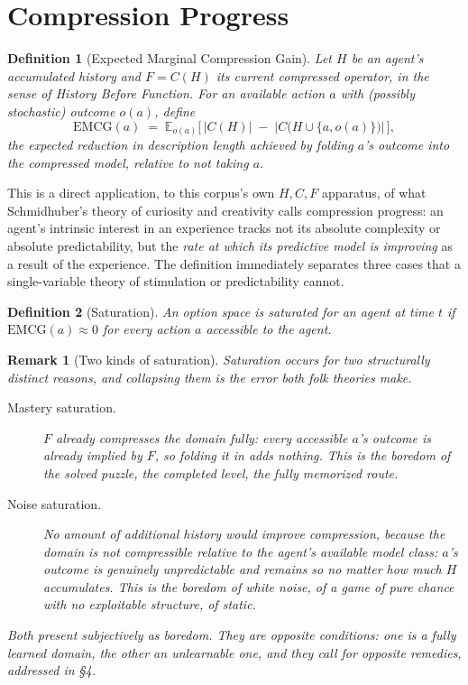 \documentclass[11pt]{article}
\newtheorem{definition}{Definition}[section]
\newtheorem*{remark}{Remark}
\begin{document}
\section{Compression Progress}

\begin{definition}[Expected Marginal Compression Gain]
Let $H$ be an agent's accumulated history and $F=C(H)$ its current compressed operator, in the sense of \emph{History Before Function}. For an available action $a$ with (possibly stochastic) outcome $o(a)$, define
\[
\mathrm{EMCG}(a) \;=\; \mathbb{E}_{o(a)}\Big[\,|C(H)| \;-\; |C\big(H\cup\{a,o(a)\}\big)|\,\Big],
\]
the expected reduction in description length achieved by folding $a$'s outcome into the compressed model, relative to not taking $a$.
\end{definition}

This is a direct application, to this corpus's own $H,C,F$ apparatus, of what Schmidhuber's theory of curiosity and creativity calls compression progress: an agent's intrinsic interest in an experience tracks not its absolute complexity or absolute predictability, but the \emph{rate at which its predictive model is improving} as a result of the experience. The definition immediately separates three cases that a single-variable theory of stimulation or predictability cannot.

\begin{definition}[Saturation]
An option space is \emph{saturated} for an agent at time $t$ if $\mathrm{EMCG}(a) \approx 0$ for every action $a$ accessible to the agent.
\end{definition}

\begin{remark}[Two kinds of saturation]
Saturation occurs for two structurally distinct reasons, and collapsing them is the error both folk theories make.
\begin{description}
\item[Mastery saturation.] $F$ already compresses the domain fully: every accessible $a$'s outcome is already implied by $F$, so folding it in adds nothing. This is the boredom of the solved puzzle, the completed level, the fully memorized route.
\item[Noise saturation.] No amount of additional history would improve compression, because the domain is not compressible relative to the agent's available model class: $a$'s outcome is genuinely unpredictable and remains so no matter how much $H$ accumulates. This is the boredom of white noise, of a game of pure chance with no exploitable structure, of static.
\end{description}
Both present subjectively as boredom. They are opposite conditions: one is a fully learned domain, the other an unlearnable one, and they call for opposite remedies, addressed in \S 4.
\end{remark}
\end{document}
